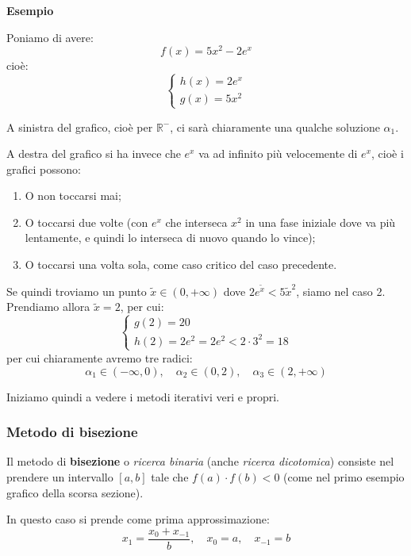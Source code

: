 \documentclass[a4paper,11pt]{article}
\begin{document}
\begin{enumerate}
		\noindent
		\textbf{\textsf{Esempio}}
		
		Poniamo di avere:
		$$
		f(x) = 5x^2 - 2 e^x
		$$
		cioè:
		\[
			\begin{cases}
				h(x) = 2 e^x \\
				g(x) = 5 x^2
			\end{cases}
		\]	

		A sinistra del grafico, cioè per $\mathbb{R}^-$, ci sarà chiaramente una qualche soluzione $\alpha_1$.
		
		A destra del grafico si ha invece che $e^x$ va ad infinito più velocemente di $e^x$, cioè i grafici possono:
		\begin{enumerate}
			\item O non toccarsi mai;
			\item O toccarsi due volte (con $e^x$ che interseca $x^2$ in una fase iniziale dove va più lentamente, e quindi lo interseca di nuovo quando lo vince);
			\item O toccarsi una volta sola, come caso critico del caso precedente.
		\end{enumerate}

		Se quindi troviamo un punto $\tilde{x} \in (0, +\infty)$ dove $2e^{\tilde{x}} < 5 \tilde{x}^2$, siamo nel caso 2.
		Prendiamo allora $\tilde{x} = 2$, per cui:
		\[
			\begin{cases}
				g(2) = 20 \\
				h(2) = 2 e^2 = 2 e^2 < 2 \cdot 3^2 = 18
			\end{cases}
		\]
		per cui chiaramente avremo tre radici:
		$$
			\alpha_1 \in (-\infty, 0), \quad \alpha_2 \in (0, 2), \quad \alpha_3 \in (2, +\infty)
		$$

\end{enumerate}

\par\medskip

Iniziamo quindi a vedere i metodi iterativi veri e propri.
\subsubsection{Metodo di bisezione}
Il metodo di \textbf{bisezione} o \textit{ricerca binaria} (anche \textit{ricerca dicotomica}) consiste nel prendere un intervallo $[a, b]$ tale che $f(a) \cdot f(b) < 0$ (come nel primo esempio grafico della scorsa sezione).

In questo caso si prende come prima approssimazione:
$$
x_1 = \frac{x_0 + x_{-1}}{b}, \quad x_0 = a, \quad x_{-1} = b
$$
\end{document}
